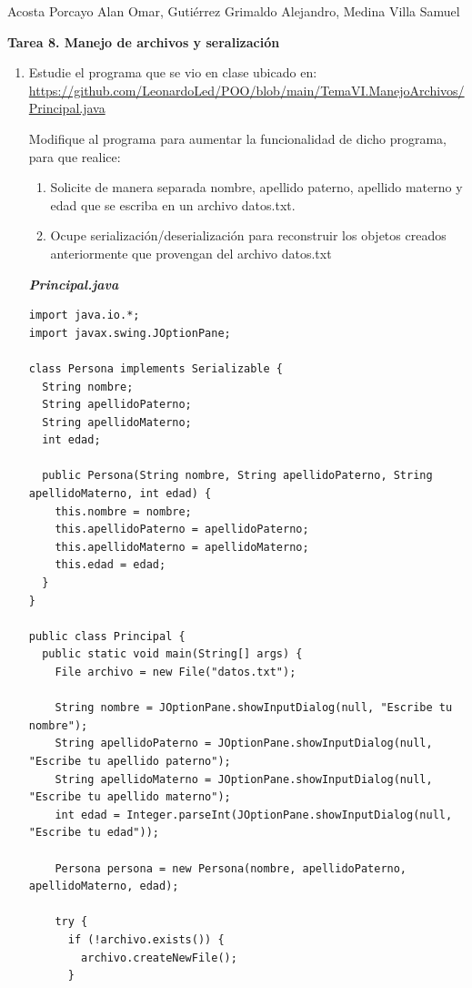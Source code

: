 \documentclass[12pt]{article}
\newcommand{\linejump}{\hfill \break}
\begin{document}
  \begin{center}
    Acosta Porcayo Alan Omar, Gutiérrez Grimaldo Alejandro, Medina Villa Samuel

    \linejump
    \LARGE \textbf{Tarea 8. Manejo de archivos y seralización}
  \end{center}
  
  \linejump
  \begin{enumerate}
    \item Estudie el programa que se vio en clase ubicado en: \url{https://github.com/LeonardoLed/POO/blob/main/TemaVI.ManejoArchivos/Principal.java}
    
    Modifique al programa para aumentar la funcionalidad de dicho programa, para que realice:
    \begin{enumerate}[label=\alph*)]
      \item Solicite de manera separada nombre, apellido paterno, apellido materno y edad que se escriba en un archivo datos.txt.
      \item Ocupe serialización/deserialización para reconstruir los objetos creados anteriormente que provengan del archivo datos.txt
    \end{enumerate}

    \textit{\textbf{Principal.java}}
    \begin{lstlisting}
import java.io.*;
import javax.swing.JOptionPane;

class Persona implements Serializable {
  String nombre;
  String apellidoPaterno;
  String apellidoMaterno;
  int edad;

  public Persona(String nombre, String apellidoPaterno, String apellidoMaterno, int edad) {
    this.nombre = nombre;
    this.apellidoPaterno = apellidoPaterno;
    this.apellidoMaterno = apellidoMaterno;
    this.edad = edad;
  }
}

public class Principal {
  public static void main(String[] args) {
    File archivo = new File("datos.txt");

    String nombre = JOptionPane.showInputDialog(null, "Escribe tu nombre");
    String apellidoPaterno = JOptionPane.showInputDialog(null, "Escribe tu apellido paterno");
    String apellidoMaterno = JOptionPane.showInputDialog(null, "Escribe tu apellido materno");
    int edad = Integer.parseInt(JOptionPane.showInputDialog(null, "Escribe tu edad"));

    Persona persona = new Persona(nombre, apellidoPaterno, apellidoMaterno, edad);

    try {
      if (!archivo.exists()) {
        archivo.createNewFile();
      }


\end{lstlisting}
\end{enumerate}
\end{document}
